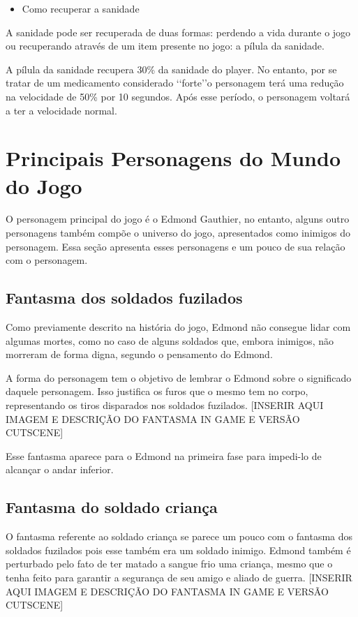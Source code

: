 \documentclass[12pt]{article}
\begin{document}
\begin{itemize}
\item Como recuperar a sanidade
\end{itemize}

A sanidade pode ser recuperada de duas formas: perdendo a vida durante o jogo ou recuperando através de um item presente no jogo: a pílula da sanidade.

A  pílula da sanidade recupera 30\% da sanidade do player. No entanto, por se tratar de um medicamento considerado \lq\lq forte\rq\rq o personagem terá uma redução na velocidade de 50\% por 10 segundos. Após esse período, o personagem voltará a ter a velocidade normal.

\section{Principais Personagens do Mundo do Jogo}

O personagem principal do jogo é o Edmond Gauthier, no entanto, alguns outro personagens também compõe o universo do jogo, apresentados como inimigos do personagem. Essa seção apresenta esses personagens e um pouco de sua relação com o personagem.

\subsection{Fantasma dos soldados fuzilados}
Como previamente descrito na história do jogo, Edmond não consegue lidar com algumas mortes, como no caso de alguns soldados que, embora inimigos, não morreram de forma digna, segundo o pensamento do Edmond. 
	
	A forma do personagem tem o objetivo de lembrar o Edmond sobre o significado daquele personagem. Isso justifica os furos que o mesmo tem no corpo, representando os tiros disparados nos soldados fuzilados. [INSERIR AQUI IMAGEM E DESCRIÇÃO DO FANTASMA IN GAME E VERSÃO CUTSCENE]
	
	Esse fantasma aparece para o Edmond na primeira fase para impedi-lo de alcançar o andar inferior.

\subsection{Fantasma do soldado criança}
 O fantasma referente ao soldado criança se parece um pouco com o fantasma dos soldados fuzilados pois esse também era um soldado inimigo. Edmond também é perturbado pelo fato de ter matado a sangue frio uma criança, mesmo que o tenha feito para garantir a segurança de seu amigo e aliado de guerra. [INSERIR AQUI IMAGEM E DESCRIÇÃO DO FANTASMA IN GAME E VERSÃO CUTSCENE]
 
\end{document}

